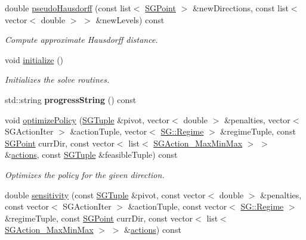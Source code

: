 \begin{DoxyCompactItemize}
\mbox{\label{classSGSolver__MaxMinMax_a161656877ab57bd615d9cfb9358bd17d}} 
double \hyperlink{classSGSolver__MaxMinMax_a161656877ab57bd615d9cfb9358bd17d}{pseudo\+Hausdorff} (const list$<$ \hyperlink{classSGPoint}{S\+G\+Point} $>$ \&new\+Directions, const list$<$ vector$<$ double $>$ $>$ \&new\+Levels) const
\begin{DoxyCompactList}\small\item\em Compute approximate Hausdorff distance. \end{DoxyCompactList}\item 
\mbox{\label{classSGSolver__MaxMinMax_a16095a92d8f4875a37515596440a7ac3}} 
void \hyperlink{classSGSolver__MaxMinMax_a16095a92d8f4875a37515596440a7ac3}{initialize} ()
\begin{DoxyCompactList}\small\item\em Initializes the solve routines. \end{DoxyCompactList}\item 
\mbox{\label{classSGSolver__MaxMinMax_a03b71a1552b65b0fd2ffe5946a11ff2a}} 
std\+::string {\bfseries progress\+String} () const
\item 
\mbox{\label{classSGSolver__MaxMinMax_ad4e7d8e969fc2446f141132c82eb7f73}} 
void \hyperlink{classSGSolver__MaxMinMax_ad4e7d8e969fc2446f141132c82eb7f73}{optimize\+Policy} (\hyperlink{classSGTuple}{S\+G\+Tuple} \&pivot, vector$<$ double $>$ \&penalties, vector$<$ S\+G\+Action\+Iter $>$ \&action\+Tuple, vector$<$ \hyperlink{namespaceSG_a139e4dec41ea0f38aae1f93f60cfff60}{S\+G\+::\+Regime} $>$ \&regime\+Tuple, const \hyperlink{classSGPoint}{S\+G\+Point} curr\+Dir, const vector$<$ list$<$ \hyperlink{classSGAction__MaxMinMax}{S\+G\+Action\+\_\+\+Max\+Min\+Max} $>$ $>$ \&\hyperlink{classSGSolver__MaxMinMax_ad1a4bf22aaa58dd05c7bc7a24d9c1805}{actions}, const \hyperlink{classSGTuple}{S\+G\+Tuple} \&feasible\+Tuple) const
\begin{DoxyCompactList}\small\item\em Optimizes the policy for the given direction. \end{DoxyCompactList}\item 
double \hyperlink{classSGSolver__MaxMinMax_a98888e37855b47fca85583d4238933b3}{sensitivity} (const \hyperlink{classSGTuple}{S\+G\+Tuple} \&pivot, const vector$<$ double $>$ \&penalties, const vector$<$ S\+G\+Action\+Iter $>$ \&action\+Tuple, const vector$<$ \hyperlink{namespaceSG_a139e4dec41ea0f38aae1f93f60cfff60}{S\+G\+::\+Regime} $>$ \&regime\+Tuple, const \hyperlink{classSGPoint}{S\+G\+Point} curr\+Dir, const vector$<$ list$<$ \hyperlink{classSGAction__MaxMinMax}{S\+G\+Action\+\_\+\+Max\+Min\+Max} $>$ $>$ \&\hyperlink{classSGSolver__MaxMinMax_ad1a4bf22aaa58dd05c7bc7a24d9c1805}{actions}) const

\end{DoxyCompactItemize}
